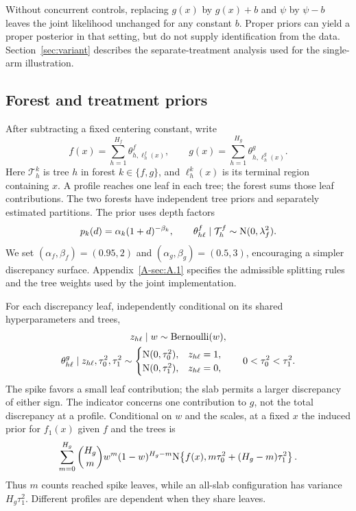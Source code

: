 \documentclass[11pt]{article}
\begin{document}
Without concurrent controls, replacing $g(x)$ by $g(x)+b$ and $\psi$ by $\psi-b$ leaves the joint likelihood unchanged for any constant $b$. Proper priors can yield a proper posterior in that setting, but do not supply identification from the data. Section~\ref{sec:variant} describes the separate-treatment analysis used for the single-arm illustration.

\subsection{Forest and treatment priors}
After subtracting a fixed centering constant, write
\begin{equation}\label{eq:trees}
f(x)=\sum_{h=1}^{H_f}\theta^f_{h,\ell_h^f(x)},\qquad
g(x)=\sum_{h=1}^{H_g}\theta^g_{h,\ell_h^g(x)}.
\end{equation}
Here $\mathcal T_h^k$ is tree $h$ in forest $k\in\{f,g\}$, and $\ell_h^k(x)$ is its terminal region containing $x$. A profile reaches one leaf in each tree; the forest sums those leaf contributions. The two forests have independent tree priors and separately estimated partitions. The prior uses depth factors
\begin{equation}\label{eq:treeprior}
p_k(d)=\alpha_k(1+d)^{-\beta_k},\qquad
\theta^f_{h\ell}\mid\mathcal T_h^f\sim\mathrm{N}(0,\lambda_f^2).
\end{equation}
We set $(\alpha_f,\beta_f)=(0.95,2)$ and $(\alpha_g,\beta_g)=(0.5,3)$, encouraging a simpler discrepancy surface. Appendix~\ref{A-sec:A.1} specifies the admissible splitting rules and the tree weights used by the joint implementation.

For each discrepancy leaf, independently conditional on its shared hyperparameters and trees,
\begin{equation}\label{eq:mixture}
\begin{gathered}
z_{h\ell}\mid w\sim\operatorname{Bernoulli}(w),\\
\theta^g_{h\ell}\mid z_{h\ell},\tau_0^2,\tau_1^2\sim
\begin{cases}\mathrm{N}(0,\tau_0^2),&z_{h\ell}=1,\\
\mathrm{N}(0,\tau_1^2),&z_{h\ell}=0,
\end{cases}\qquad 0<\tau_0^2<\tau_1^2.
\end{gathered}
\end{equation}
The spike favors a small leaf contribution; the slab permits a larger discrepancy of either sign. The indicator concerns one contribution to $g$, not the total discrepancy at a profile. Conditional on $w$ and the scales, at a fixed $x$ the induced prior for $f_1(x)$ given $f$ and the trees is
\begin{equation}\label{eq:inducedmixture}
\sum_{m=0}^{H_g}\binom{H_g}{m}w^m(1-w)^{H_g-m}
\mathrm{N}\!\left\{f(x),m\tau_0^2+(H_g-m)\tau_1^2\right\}.
\end{equation}
Thus $m$ counts reached spike leaves, while an all-slab configuration has variance $H_g\tau_1^2$. Different profiles are dependent when they share leaves.
\end{document}
